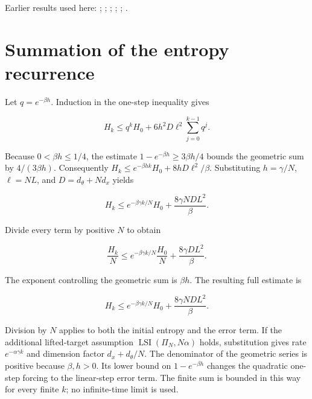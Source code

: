 \documentclass[11pt,a4paper]{article}
\begin{document}
Earlier results used here: \cite[Section~3.1.3]{LangevinLean2026ULALSI}; \cite[Section~3.34.1]{LangevinLean2026ULALSI}; \cite[Section~3.1.1]{LangevinLean2026IPLA}; \cite[Section~3.1.3]{LangevinLean2026IPLA}; \cite[Section~3.1.4]{LangevinLean2026IPLA}; \cite[Section~3.3.2]{LangevinLean2026IPLA}.

\section{\texorpdfstring{Summation of the entropy recurrence}{Summation of the entropy recurrence}}


Let \(q=e^{-\beta h}\). Induction in the one-step inequality gives

\[H_k\le q^kH_0+6h^2D\ell^2\sum_{j=0}^{k-1}q^j.\]

Because \(0<\beta h\le1/4\), the estimate \(1-e^{-\beta h}\ge3\beta h/4\) bounds the geometric sum by \(4/(3\beta h)\). Consequently \(H_k\le e^{-\beta hk}H_0+8hD\ell^2/\beta\). Substituting \(h=\gamma/N\), \(\ell=NL\), and \(D=d_\theta+Nd_x\) yields

\[H_k\le e^{-\beta\gamma k/N}H_0+\frac{8\gamma ND L^2}{\beta}.\]

Divide every term by positive \(N\) to obtain

\[\frac{H_k}{N}\le e^{-\beta\gamma k/N}\frac{H_0}{N}+\frac{8\gamma DL^2}{\beta}.\]

The exponent controlling the geometric sum is \(\beta h\). The resulting full estimate is

\[H_k\le e^{-\beta\gamma k/N}H_0+\frac{8\gamma NDL^2}{\beta}.\]

Division by \(N\) applies to both the initial entropy and the error term. If the additional lifted-target assumption \(\operatorname{LSI}(\Pi_N,N\alpha)\) holds, substitution gives rate \(e^{-\alpha\gamma k}\) and dimension factor \(d_x+d_\theta/N\). The denominator of the geometric series is positive because \(\beta,h>0\). Its lower bound on \(1-e^{-\beta h}\) changes the quadratic one-step forcing to the linear-step error term. The finite sum is bounded in this way for every finite \(k\); no infinite-time limit is used.
\end{document}
